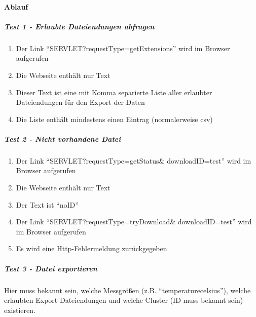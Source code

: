 \paragraph{Ablauf}
\subparagraph{Test 1 - Erlaubte Dateiendungen abfragen}
\begin{enumerate}
\item Der Link ``SERVLET?requestType=getExtensions'' wird im Browser aufgerufen
\item Die Webseite enthält nur Text
\item Dieser Text ist eine mit Komma separierte Liste aller erlaubter Dateiendungen für den Export der Daten
\item Die Liste enthält mindestens einen Eintrag (normalerweise csv)
\end{enumerate}
\subparagraph{Test 2 - Nicht vorhandene Datei}
\begin{enumerate}
\item Der Link ``SERVLET?requestType=getStatus\& downloadID=test'' wird im Browser aufgerufen
\item Die Webseite enthält nur Text
\item Der Text ist ``noID''
\item Der Link ``SERVLET?requestType=tryDownload\& downloadID=test'' wird im Browser aufgerufen
\item Es wird eine Http-Fehlermeldung zurückgegeben
\end{enumerate}
\subparagraph{Test 3 - Datei exportieren}
Hier muss bekannt sein, welche Messgrößen (z.B. ``temperature\textunderscore celsius''), welche erlaubten Export-Dateiendungen und welche Cluster (ID muss bekannt sein) existieren.
